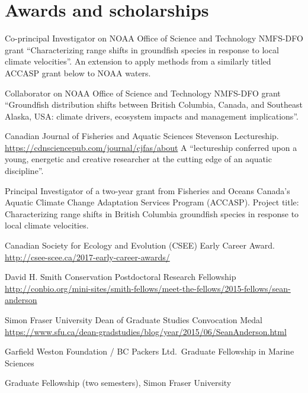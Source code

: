 \hypertarget{awards-and-scholarships}{%
\section{Awards and scholarships}\label{awards-and-scholarships}}

\begin{description}
\tightlist
\item[2020--21]
Co-principal Investigator on NOAA Office of Science and Technology
NMFS-DFO grant ``Characterizing range shifts in groundfish species in
response to local climate velocities''. An extension to apply methods
from a similarly titled ACCASP grant below to NOAA waters.
\item[2020--21]
Collaborator on NOAA Office of Science and Technology NMFS-DFO grant
``Groundfish distribution shifts between British Columbia, Canada, and
Southeast Alaska, USA: climate drivers, ecosystem impacts and management
implications''.
\item[2019]
Canadian Journal of Fisheries and Aquatic Sciences Stevenson
Lectureship. \url{https://cdnsciencepub.com/journal/cjfas/about} A
``lectureship conferred upon a young, energetic and creative researcher
at the cutting edge of an aquatic discipline''.
\item[2018--20]
Principal Investigator of a two-year grant from Fisheries and Oceans
Canada's Aquatic Climate Change Adaptation Services Program (ACCASP).
Project title: Characterizing range shifts in British Columbia
groundfish species in response to local climate velocities.
\item[2017]
Canadian Society for Ecology and Evolution (CSEE) Early Career Award.\\
\url{http://csee-scee.ca/2017-early-career-awards/}
\item[2015]
David H. Smith Conservation Postdoctoral Research Fellowship\\
\url{http://conbio.org/mini-sites/smith-fellows/meet-the-fellows/2015-fellows/sean-anderson}
\item[2015]
Simon Fraser University Dean of Graduate Studies Convocation Medal\\
\url{https://www.sfu.ca/dean-gradstudies/blog/year/2015/06/SeanAnderson.html}
\item[2014]
Garfield Weston Foundation / BC Packers Ltd.\ Graduate Fellowship in
Marine Sciences
\item[2014]
Graduate Fellowship (two semesters), Simon Fraser University
\item[2012--13]

\end{description}
